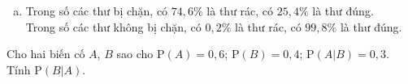 \begin{bt}
{\begin{enumerate}[a)]
	\begin{itemize}
		\item Tính $P(\overline{B} \mid A)$: Ta có $(\overline{B} \mid A)=1-P(B \mid A)=0{,}05$.
		\item Tính $P(\overline{B} \mid \overline{A})$: Ta có $P(\overline{B} \mid \overline{A})=1-P(B \mid \overline{A})=0{,}99$.
	\end{itemize}
	Vậy $P(\overline{A}\mid \overline{B}) = \dfrac{P(\overline{A})\cdot P(\overline{B}\mid \overline{A})}{P(\overline{A})\cdot P(\overline{B}\mid \overline{A}) + P(A)\cdot P(\overline{B} \mid A)}=\dfrac{0{,}97\cdot 0{,}99}{0{,}97\cdot 0{,}99+0{,}03\cdot 0{,}05}=\dfrac{3201}{3206}\approx 0{,}998$.\\
	Vậy xác suất để chọn ngẫu nhiên một thư không bị chặn mà thư đó là thư đúng là khoảng $0{,}998$.
	\item Trong số các thư bị chặn, có $74{,}6 \%$ là thư rác, có $25{,}4 \%$ là thư đúng. \\
	Trong số các thư không bị chặn, có $0{,}2 \%$ là thư rác, có $99{,}8 \%$ là thư đúng.
	\end{enumerate}
}

\end{bt}

\begin{vd}[CD]%
	Cho hai biến cố $A$, $B$ sao cho $\mathrm{P}(A) = 0{,}6$; $\mathrm{P}(B)=0{,}4$; $\mathrm{P}(A|B) = 0{,}3$. Tính $\mathrm{P}(B|A)$.
\end{vd}

